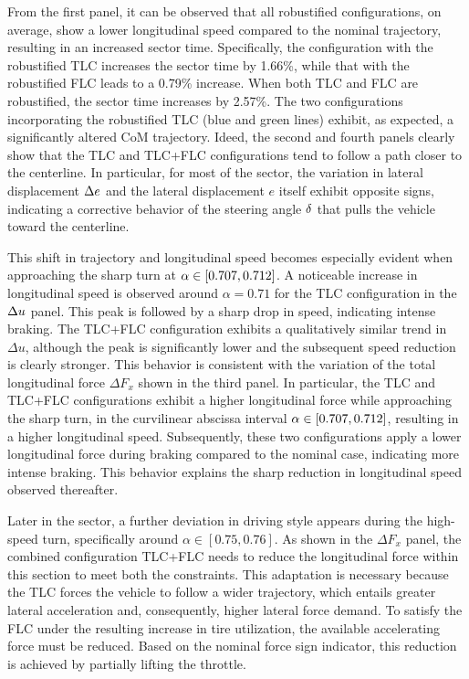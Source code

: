 
From the first panel, it can be observed that all robustified configurations, on average, show a lower longitudinal speed compared to the nominal trajectory, resulting in an increased sector time. Specifically, the configuration with the robustified TLC increases the sector time by 1.66\%, while that with the robustified FLC leads to a 0.79\% increase. When both TLC and FLC are robustified, the sector time increases by 2.57\%.
The two configurations incorporating the robustified TLC (blue and green lines) exhibit, as expected, a significantly altered CoM trajectory.
Ideed, the second and fourth panels clearly show that the TLC and TLC+FLC configurations tend to follow a path closer to the centerline. In particular, for most of the sector, the variation in lateral displacement $\Delta e$ and the lateral displacement $e$ itself exhibit opposite signs, indicating a corrective behavior of the steering angle $\delta$ that pulls the vehicle toward the centerline.


This shift in trajectory and longitudinal speed becomes especially evident when approaching the sharp turn at $\alpha \in [0.707, 0.712]$. A noticeable increase in longitudinal speed is observed around $\alpha = 0.71$ for the TLC configuration  in the $\Delta u$ panel. This peak is followed by a sharp drop in speed, indicating intense braking.
The TLC+FLC configuration exhibits a qualitatively similar trend in $\Delta u$, although the peak is significantly lower and the subsequent speed reduction is clearly stronger. This behavior is consistent with the variation of the total longitudinal force $\Delta F_x$ shown in the third panel.
In particular, the TLC and TLC+FLC configurations exhibit a higher longitudinal force while approaching the sharp turn, in the curvilinear abscissa interval $\alpha\in\left[0.707, 0.712\right]$, resulting in a higher longitudinal speed.
Subsequently, these two configurations apply a lower longitudinal force during braking compared to the nominal case, indicating more intense braking. This behavior explains the sharp reduction in longitudinal speed observed thereafter.


Later in the sector, a further deviation in driving style appears during the high-speed turn, specifically around $\alpha \in [0.75, 0.76]$.
As shown in the $\Delta F_x$ panel, the combined configuration TLC+FLC needs to reduce the longitudinal force within this section to meet both the constraints.
This adaptation is necessary because the TLC forces the vehicle to follow a wider trajectory, which entails greater lateral acceleration and, consequently, higher lateral force demand. To satisfy the FLC under the resulting increase in tire utilization, the available accelerating force must be reduced.
Based on the nominal force sign indicator, this reduction is achieved by partially lifting the throttle.

